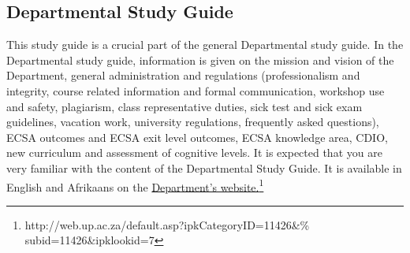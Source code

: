     \subsection{Departmental Study Guide} \label{sec:dep_study_guide}
        This study guide is a crucial part of the general Departmental study guide.
        In the Departmental study guide, information is given
        on the mission and vision of the Department, general administration and
        regulations (professionalism and integrity, course related information
        and formal communication, workshop use and safety, plagiarism, class
        representative duties, sick test and sick exam guidelines, vacation
        work, university regulations, frequently asked questions), ECSA
        outcomes and ECSA exit level outcomes, ECSA knowledge area, CDIO,
        new curriculum and assessment of cognitive levels. It is expected that
        you are very familiar with the content of the Departmental Study Guide.
        It is available in English and Afrikaans on the
        \href{http://web.up.ac.za/default.asp?ipkCategoryID=11426&%
                subid=11426&ipklookid=7}%
                {Department’s website.\footnote{\label{note3}%
                    \url{http://web.up.ac.za/default.asp?ipkCategoryID=11426&%
                        subid=11426&ipklookid=7}}}

